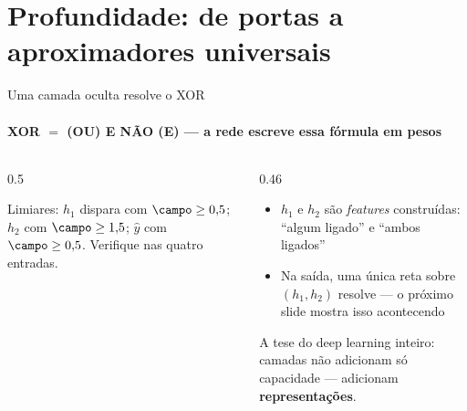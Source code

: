 \documentclass[aspectratio=169, 11pt]{beamer}
\begin{document}
\section{Profundidade: de portas a aproximadores universais}

\begin{frame}{Uma camada oculta resolve o XOR}
  \framesubtitle{XOR $=$ (OU) E NÃO (E) — a rede escreve essa fórmula em pesos}

  \begin{columns}[T]
    \begin{column}{0.5\textwidth}
      \begin{center}
      \end{center}
      \small Limiares: $h_1$ dispara com $\campo \ge 0{,}5$; $h_2$ com
      $\campo \ge 1{,}5$; $\hat y$ com $\campo \ge 0{,}5$. Verifique nas
      quatro entradas.
    \end{column}
    \begin{column}{0.46\textwidth}
      \begin{itemize}\setlength{\itemsep}{0.35ex}
        \item $h_1$ e $h_2$ são \emph{features} construídas: ``algum ligado''
              e ``ambos ligados''
        \item Na saída, uma única reta sobre $(h_1, h_2)$ resolve — o
              próximo slide mostra isso acontecendo
      \end{itemize}
      \begin{ideiabox}
        A tese do deep learning inteiro: camadas não adicionam só capacidade —
        adicionam \textbf{representações}.
      \end{ideiabox}
    \end{column}
  \end{columns}
\end{frame}
\end{document}
